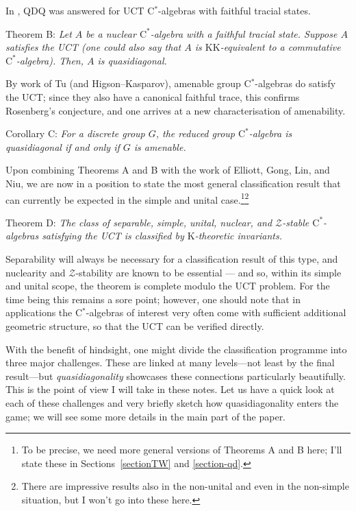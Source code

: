 \documentclass{amsart}
\begin{document}
In \cite{TWW}, QDQ was answered for UCT C$^*$-algebras with faithful tracial states. 

\noindent
{\sc Theorem B:} \emph{Let $A$ be a nuclear $\mathrm{C}^*$-algebra with a faithful tracial state. Suppose $A$ satisfies the UCT (one could also say that $A$ is $\mathrm{KK}$-equivalent to a commutative $\mathrm{C}^*$-algebra). 
Then, $A$ is quasidiagonal.} 


By work of Tu (and Higson--Kasparov), amenable group C$^*$-algebras do satisfy the UCT; since they also have a canonical faithful trace, this confirms Rosenberg's conjecture, and one arrives at a new characterisation of amenability.


\noindent
{\sc Corollary C:} \emph{For a discrete group $G$, the reduced group $\mathrm{C}^*$-algebra is quasidiagonal if and only if $G$ is amenable.}

Upon combining Theorems A and B with the work of Elliott, Gong, Lin, and Niu, we are now in a position to state the most general classification result that can currently be expected in the simple and unital case.\footnote{To be precise, we need more general versions of Theorems A and B here; I'll state these in Sections~{\ref{sectionTW}} and {\ref{section-qd}.}}\footnote{There are impressive results also in the non-unital and even in the non-simple situation, but I won't go into these here.}


\noindent
{\sc Theorem D:} \emph{The class of separable, simple, unital, nuclear, and $\mathcal{Z}$-stable $\mathrm{C}^*$-algebras satisfying the UCT is classified by $\mathrm{K}$-theoretic invariants.}

Separability will always be necessary for a classification result of this type, and nuclearity and $\mathcal{Z}$-stability are known to be essential --- and so, within its simple and unital scope, the theorem is complete modulo the UCT problem. For the time being this remains a sore point; however, one should note that in applications the C$^*$-algebras of interest  very often come with sufficient additional geometric structure, so that the UCT can be verified directly. 




With the benefit of hindsight, one might divide the classification programme into three major challenges.  
These are linked at many levels---not least by the final result---but \emph{quasidiagonality} showcases these connections particularly beautifully.  This is the point of view I will take in these notes. Let us have a quick look at each of these challenges and very briefly sketch how quasidiagonality enters the game; we will see some more details in the main part of the paper.
\end{document}
